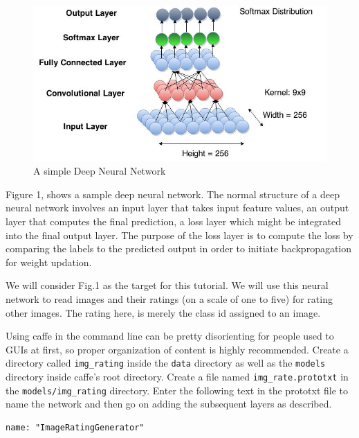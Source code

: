 \documentclass{article}
\begin{document}
\begin{figure}[bpht!]
	\centering
	\includegraphics[scale=0.5]{Images/img_rating.jpg}
	\caption{A simple Deep Neural Network}
\end{figure}

Figure 1, shows a sample deep neural network. The normal structure of a deep neural network involves an input layer that takes input feature values, an output layer that computes the final prediction, a loss layer which might be integrated into the final output layer. The purpose of the loss layer is to compute the loss by comparing the labels to the predicted output in order to initiate backpropagation for weight updation.
\par
We will consider Fig.1 as the target for this tutorial. We will use this neural network to read images and their ratings (on a scale of one to five) for rating other images. The rating here, is merely the class id assigned to an image.
\par
Using caffe in the command line can be pretty disorienting for people used to GUIs at first, so proper organization of content is highly recommended. Create a directory called \verb|img_rating| inside the \verb|data| directory as well as the \verb|models| directory inside caffe's root directory. Create a file named \verb|img_rate.prototxt| in the \verb|models/img_rating| directory. Enter the following text in the prototxt file to name the network and then go on adding the subsequent layers as described.
\begin{lstlisting}[tabsize=2,breaklines=true]
name: "ImageRatingGenerator"
\end{lstlisting}
\end{document}
